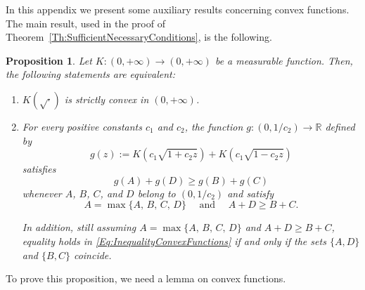 \documentclass[12pt,reqno]{amsart}
\newtheorem{proposition}[theorem]{Proposition}
\theoremstyle{definition}
\theoremstyle{remark}
\newcommand{\con}[1]{\mathbb{#1}}
\newcommand{\R}{\con{R}} %
\numberwithin{equation}{section}
\begin{document}
In this appendix we present some auxiliary results concerning convex functions. The main result, used in the proof of Theorem~\ref{Th:SufficientNecessaryConditions}, is the following.



\begin{proposition}
	\label{Prop:EquivalenceK(sqrt)Convex<->Inequality}
	Let $K:(0, +\infty) \to (0,+\infty)$ be a measurable function. Then, the following statements are equivalent:
	\begin{enumerate}
		\item[i)] $K(\sqrt{\cdot})$ is strictly convex in $(0, +\infty)$.
		\item[ii)] For every positive constants $c_1$ and $c_2$, the function $g:(0,1/c_2)\to \R$ defined by
		\begin{equation}
		\label{Eq:DefinitiongFromK}
		g(z) := K(c_1 \sqrt{1 + c_2z}) + K(c_1 \sqrt{1 - c_2z})
		\end{equation}
		satisfies 
		\begin{equation}
		\label{Eq:InequalityConvexFunctions}
		g(A) + g(D) \geq g(B) + g(C)
		\end{equation}
		whenever $A$, $B$, $C$, and $D$ belong to $(0, 1/c_2)$ and satisfy
		$$
		A = \max\{A,\, B,\, C,\, D\} \quad \text{ and } \quad A + D \geq B + C.
		$$
		
		In addition, still assuming $A = \max\{A,\, B,\, C,\, D\}$ and $A + D \geq B + C$, equality holds in \eqref{Eq:InequalityConvexFunctions} if and only if the sets $\{A,D\}$ and $\{B,C\}$ coincide.	
	\end{enumerate}
\end{proposition}



To prove this proposition, we need a lemma on convex functions. 
\end{document}
